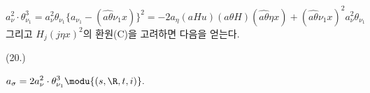 
\[
a_\nu^2\cdot\theta_{\nu_1}^3=a_\nu^2\theta_{\nu_1}\{a_{\nu_1}-(\widehat{a\theta}\nu_1x)\}^2
=-2a_\eta(aHu)(a\theta H)(\widehat{a\theta}\eta x)+(\widehat{a\theta}\nu_1x)^2a_\nu^2\theta_{\nu_1}
\]
그리고 $H_j(j\eta x)^2$의 환원(C)을 고려하면 다음을 얻는다.
\par\smallskip\noindent
\begin{minipage}[c]{4.8em}
\centering (20.)
\end{minipage}%
\begin{minipage}[c]{\dimexpr\linewidth-4.8em\relax}
\centering
\(\displaystyle a_\sigma=2a_\nu^2\cdot\theta_{\nu_1}^3\modu{(s,\R,t,i)}.\)
\end{minipage}
\par\smallskip
